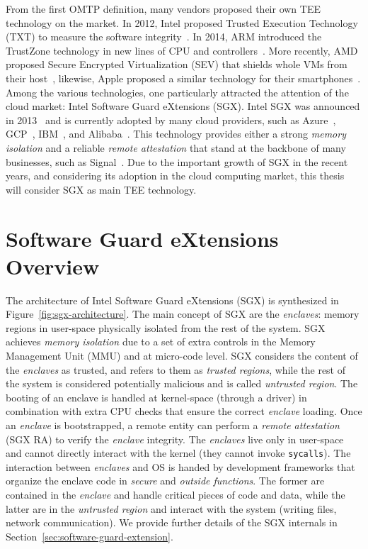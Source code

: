 From the first OMTP definition, many vendors proposed their own TEE technology 
on the market.
In 2012, Intel proposed  Trusted Execution Technology 
(TXT) to measure the software integrity~\citep{greene2012intel}.
In 2014, ARM introduced the TrustZone technology in new lines of CPU and 
controllers~\citep{arm-trustzone}. 
More recently, AMD proposed Secure Encrypted Virtualization 
(SEV) that shields whole VMs from their host~\citep{amdsev}, likewise,
Apple proposed a similar technology for their smartphones~\citep{apple-enclave}.
Among the various technologies, one particularly attracted the attention of the 
cloud market: Intel Software Guard eXtensions (SGX).
Intel SGX was announced in 2013~\citep{rozas2013intel} and is currently adopted 
by many cloud providers, such as Azure~\citep{azure}, 
GCP~\citep{challita2018precise}, IBM~\citep{IBM}, and 
Alibaba~\citep{alibabasgx}.
This technology provides either a strong \emph{memory isolation} and a reliable 
\emph{remote attestation} that stand at the backbone of many businesses, such 
as Signal~\citep{signal}.
Due to the important growth of SGX in the recent years, and considering its 
adoption in the cloud computing market, this thesis will consider SGX as main 
TEE technology.

\section{Software Guard eXtensions Overview}

The architecture of Intel Software Guard eXtensions (SGX) is synthesized in 
Figure~\ref{fig:sgx-architecture}.
The main concept of SGX are the \emph{enclaves}: memory regions in user-space 
physically isolated from the rest of the system.
SGX achieves \emph{memory isolation} due to a set of extra controls in the 
Memory Management Unit (MMU) and at micro-code level.
SGX considers the content of the \emph{enclaves} as trusted, and refers to them 
as \emph{trusted regions}, while the rest of the system is considered 
potentially malicious and is called \emph{untrusted region}.
The booting of an enclave is handled at kernel-space (\ie through a driver) in 
combination with extra CPU checks that ensure the correct \emph{enclave} 
loading.
Once an \emph{enclave} is bootstrapped, a remote entity can perform a 
\emph{remote attestation} (SGX RA) to verify the \emph{enclave} integrity.
The \emph{enclaves} live only in user-space and cannot directly 
interact with the kernel (\ie they cannot invoke \texttt{sycalls}).
The interaction between \emph{enclaves} and OS is handed by development 
frameworks that organize the enclave code in \emph{secure} and \emph{outside 
functions}.
The former are contained in the \emph{enclave} and handle critical pieces of 
code and data, while the latter are in the \emph{untrusted region} and interact 
with the system (\eg writing files, network communication).
We provide further details of the SGX internals in 
Section~\ref{sec:software-guard-extension}.

